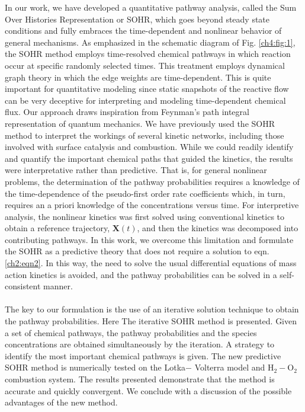 In our work, we have developed a quantitative pathway
analysis, called the Sum Over Histories Representation or
SOHR, which goes beyond steady state conditions and fully
embraces the time-dependent and nonlinear behavior of
general mechanisms. As emphasized in the schematic diagram
of Fig. \ref{ch4:fig:1}, the SOHR method employs time-resolved chemical pathways in which reaction occur at specific randomly selected
times. This treatment employs dynamical graph theory\cite{ch1_IRPC_45_harary1997dynamic} in
which the edge weights are time-dependent. This is quite
important for quantitative modeling since static snapshots of
the reactive flow can be very deceptive for interpreting and
modeling time-dependent chemical flux. Our approach draws
inspiration from Feynman’s path integral representation of
quantum mechanics.\cite{ch4_26_feynman2010quantum} We have previously used the SOHR
method to interpret the workings of several kinetic networks,
including those involved with surface catalysis and combustion.
While we could readily identify and quantify the important
chemical paths that guided the kinetics, the results were
interpretative rather than predictive. That is, for general
nonlinear problems, the determination of the pathway
probabilities requires a knowledge of the time-dependence of
the pseudo-first order rate coefficients which, in turn, requires
an a priori knowledge of the concentrations versus time. For
interpretive analysis, the nonlinear kinetics was first solved
using conventional kinetics to obtain a reference trajectory,
$\mathbf{X}(t)$, and then the kinetics was decomposed into contributing
pathways. In this work, we overcome this limitation and formulate the SOHR as a predictive theory that does not
require a solution to eqn. \ref{ch2:eqn2}. In this way, the need to solve the
usual differential equations of mass action kinetics is avoided,
and the pathway probabilities can be solved in a self-consistent
manner.
\newline
\paragraph{}
The key to our formulation is the use of an iterative solution
technique to obtain the pathway probabilities. Here The iterative SOHR
method is presented. Given a set of chemical pathways, the
pathway probabilities and the species concentrations are
obtained simultaneously by the iteration. A strategy to identify
the most important chemical pathways is given. The new
predictive SOHR method is numerically tested on the Lotka$−$
Volterra model and H$_2-$O$_2$ combustion system. The results
presented demonstrate that the method is accurate and quickly
convergent. We conclude with a discussion of the possible
advantages of the new method.
